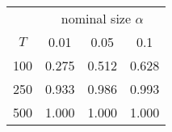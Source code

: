 % 
\begin{tabular}{cccc}
  \hline
  & \multicolumn{3}{c}{nominal size $\alpha$} \\
 $T$ & 0.01 & 0.05 & 0.1 \\
 \hline
100 & 0.275 & 0.512 & 0.628 \\ 
  250 & 0.933 & 0.986 & 0.993 \\ 
  500 & 1.000 & 1.000 & 1.000 \\ 
   \hline
\end{tabular}
